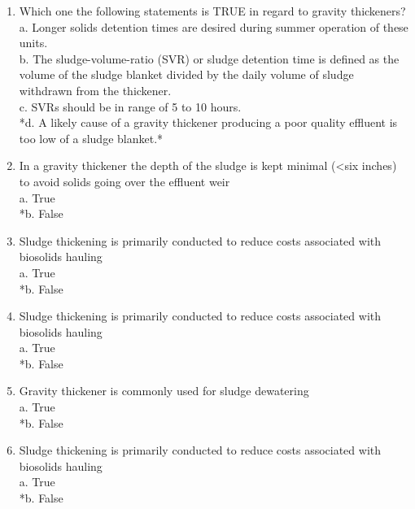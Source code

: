 \documentclass{article}
\begin{document}
\begin{enumerate}
\item  Which one the following statements is TRUE in regard to gravity thickeners? \\

a. Longer solids detention times are desired during summer operation of these units. \\
b. The sludge-volume-ratio (SVR) or sludge detention time is defined as the volume of the sludge blanket divided by the daily volume of sludge withdrawn from the thickener. \\
c. SVRs should be in range of 5 to 10 hours. \\
*d. A likely cause of a gravity thickener producing a poor quality effluent is too low of a sludge blanket.* \\

\item  In a gravity thickener the depth of the sludge is kept minimal (<six inches) to avoid solids going over the effluent weir \\

a. True \\
*b. False \\

\item  Sludge thickening is primarily conducted to reduce costs associated with biosolids hauling\\


a. True \\
*b. False \\

\item  Sludge thickening is primarily conducted to reduce costs associated with biosolids hauling \\

a. True \\
*b. False \\

\item  Gravity thickener is commonly used for sludge dewatering \\

a. True \\
*b. False \\

\item  Sludge thickening is primarily conducted to reduce costs associated with biosolids hauling \\

a. True \\
*b. False \\


\end{enumerate}
\end{document}
